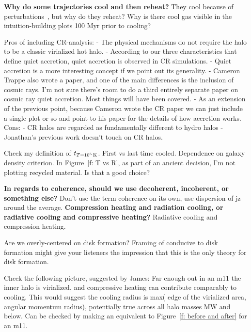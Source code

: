 \documentclass[fleqn,usenatbib]{mnras}
\newcommand{\tcon}{t_{T=10^5\,{\rm K}}}
\begin{document}
\textbf{Why do some trajectories cool and then reheat?}
They cool because of perturbations~\citep{Esmerian2020}, but why do they reheat?
Why is there cool gas visible in the intuition-building plots 100 Myr prior to cooling?

Pros of including CR-analysis:
- The physical mechanisms do not require the halo to be a classic virialized hot halo.
- According to our three characteristics that define quiet accretion, quiet accretion is observed in CR simulations.
- Quiet accretion is a more interesting concept if we point out its generality.
- Cameron Trappe also wrote a paper, and one of the main differences is the inclusion of cosmic rays. I'm not sure there's room to do a third entirely separate paper on cosmic ray quiet accretion. Most things will have been covered.
- As an extension of the previous point, because Cameron wrote the CR paper we can just include a single plot or so and point to his paper for the details of how accretion works.
Cons:
- CR halos are regarded as fundamentally different to hydro halos
- Jonathan's previous work doesn't touch on CR halos.

Check my definition of $\tcon$.
First vs last time cooled.
Dependence on galaxy density criterion.
In Figure~\ref{f: T vs R}, as part of an ancient decision, I'm not plotting recycled material.
Is that a good choice?

\textbf{In regards to coherence, should we use decoherent, incoherent, or something else?}
Don't use the term coherence on its own, use dispersion of jz around the average.
\textbf{Compression heating and radiation cooling, or radiative cooling and compressive heating?}
Radiative cooling and compression heating.

Are we overly-centered on disk formation?
Framing of conducive to disk formation might give your listeners the impression that this is the only theory for disk formation.

Check the following picture, suggested by James:
Far enough out in an m11 the inner halo is virialized, and compressive heating can contribute comparably to cooling.
This would suggest the cooling radius is max( edge of the virialized area, angular momentum radius), potentially true across all halo masses MW and below.
Can be checked by making an equivalent to Figure~\ref{f: before and after} for an m11.
\end{document}
